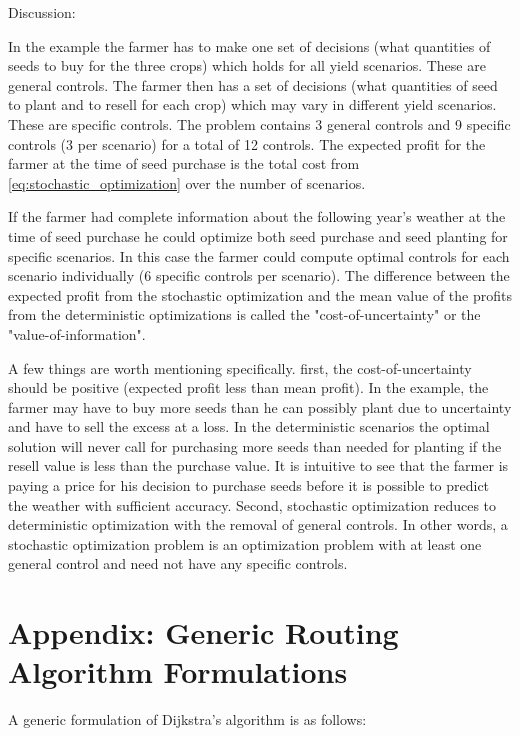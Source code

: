 \documentclass[12pt]{article}
\begin{document}
\medskip

\noindent Discussion:

\medskip

In the example the farmer has to make one set of decisions (what quantities of seeds to buy for the three crops) which holds for all yield scenarios. These are general controls. The farmer then has a set of decisions (what quantities of seed to plant and to resell for each crop) which may vary in different yield scenarios. These are specific controls. The problem contains 3 general controls and 9 specific controls (3 per scenario) for a total of 12 controls. The expected profit for the farmer at the time of seed purchase is the total cost from \eqref{eq:stochastic_optimization} over the number of scenarios.

If the farmer had complete information about the following year's weather at the time of seed purchase he could optimize both seed purchase and seed planting for specific scenarios. In this case the farmer could compute optimal controls for each scenario individually (6 specific controls per scenario). The difference between the expected profit from the stochastic optimization and the mean value of the profits from the deterministic optimizations is called the "cost-of-uncertainty" or the "value-of-information".

A few things are worth mentioning specifically. first, the cost-of-uncertainty should be positive (expected profit less than mean profit). In the example, the farmer may have to buy more seeds than he can possibly plant due to uncertainty and have to sell the excess at a loss. In the deterministic scenarios the optimal solution will never call for purchasing more seeds than needed for planting if the resell value is less than the purchase value. It is intuitive to see that the farmer is paying a price for his decision to purchase seeds before it is possible to predict the weather with sufficient accuracy. Second, stochastic optimization reduces to deterministic optimization with the removal of general controls. In other words, a stochastic optimization problem is an optimization problem with at least one general control and need not have any specific controls.
	
\section*{Appendix: Generic Routing Algorithm Formulations}

\noindent A generic formulation of Dijkstra's algorithm is as follows:
\end{document}
